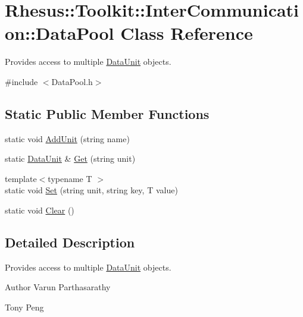 \hypertarget{class_rhesus_1_1_toolkit_1_1_inter_communication_1_1_data_pool}{\section{Rhesus\-:\-:Toolkit\-:\-:Inter\-Communication\-:\-:Data\-Pool Class Reference}
\label{class_rhesus_1_1_toolkit_1_1_inter_communication_1_1_data_pool}
}


Provides access to multiple \hyperlink{class_rhesus_1_1_toolkit_1_1_inter_communication_1_1_data_unit}{Data\-Unit} objects.  




{\ttfamily \#include $<$Data\-Pool.\-h$>$}

\subsection*{Static Public Member Functions}
\begin{DoxyCompactItemize}
\item 
static void \hyperlink{class_rhesus_1_1_toolkit_1_1_inter_communication_1_1_data_pool_a77259c74e875fd638d1a15bd42a46c08}{Add\-Unit} (string name)
\item 
static \hyperlink{class_rhesus_1_1_toolkit_1_1_inter_communication_1_1_data_unit}{Data\-Unit} \& \hyperlink{class_rhesus_1_1_toolkit_1_1_inter_communication_1_1_data_pool_ae826f62b3708d0f2db37a788879456f1}{Get} (string unit)
\item 
{\footnotesize template$<$typename T $>$ }\\static void \hyperlink{class_rhesus_1_1_toolkit_1_1_inter_communication_1_1_data_pool_a3dcf216fb8aa49255b10fd245bb06cfe}{Set} (string unit, string key, T value)
\item 
static void \hyperlink{class_rhesus_1_1_toolkit_1_1_inter_communication_1_1_data_pool_ad4b07d57880ee9dc05195e4b8715529e}{Clear} ()
\end{DoxyCompactItemize}


\subsection{Detailed Description}
Provides access to multiple \hyperlink{class_rhesus_1_1_toolkit_1_1_inter_communication_1_1_data_unit}{Data\-Unit} objects. 

\begin{DoxyAuthor}{Author}
Varun Parthasarathy 

Tony Peng 
\end{DoxyAuthor}



